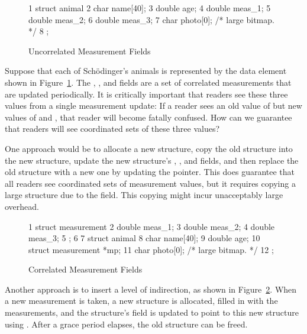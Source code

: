 \begin{figure}[tbp]
{ \scriptsize
\begin{verbbox}
 1 struct animal {
 2   char name[40];
 3   double age;
 4   double meas_1;
 5   double meas_2;
 6   double meas_3;
 7   char photo[0]; /* large bitmap. */
 8 };
\end{verbbox}
}
\centering
\theverbbox
\caption{Uncorrelated Measurement Fields}
\label{fig:together:Uncorrelated Measurement Fields}
\end{figure}

Suppose that each of Sch\"odinger's animals is represented by the
data element shown in
Figure~\ref{fig:together:Uncorrelated Measurement Fields}.
The , , and  fields are a set
of correlated measurements that are updated periodically.
It is critically important that readers see these three values from
a single measurement update: If a reader sees an old value of
 but new values of  and , that
reader will become fatally confused.
How can we guarantee that readers will see coordinated sets of these
three values?

One approach would be to allocate a new  structure,
copy the old structure into the new structure, update the new
structure's , , and  fields,
and then replace the old structure with a new one by updating
the pointer.
This does guarantee that all readers see coordinated sets of
measurement values, but it requires copying a large structure due
to the  field.
This copying might incur unacceptably large overhead.

\begin{figure}[tbp]
{ \scriptsize
\begin{verbbox}
 1 struct measurement {
 2   double meas_1;
 3   double meas_2;
 4   double meas_3;
 5 };
 6 
 7 struct animal {
 8   char name[40];
 9   double age;
10   struct measurement *mp;
11   char photo[0]; /* large bitmap. */
12 };
\end{verbbox}
}
\centering
\theverbbox
\caption{Correlated Measurement Fields}
\label{fig:together:Correlated Measurement Fields}
\end{figure}

Another approach is to insert a level of indirection, as shown in
Figure~\ref{fig:together:Correlated Measurement Fields}.
When a new measurement is taken, a new  structure
is allocated, filled in with the measurements, and the 
structure's  field is updated to point to this new
 structure using .
After a grace period elapses, the old  structure
can be freed.

